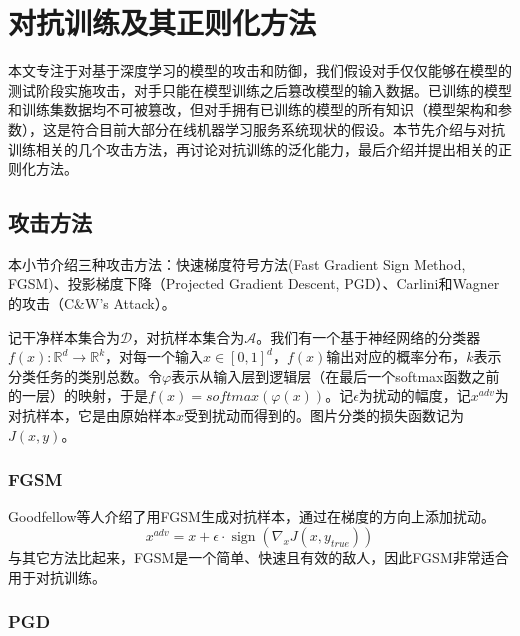 \chapter{对抗训练及其正则化方法}

本文专注于对基于深度学习的模型的攻击和防御，我们假设对手仅仅能够在模型的测试阶段实施攻击，对手只能在模型训练之后篡改模型的输入数据。已训练的模型和训练集数据均不可被篡改，但对手拥有已训练的模型的所有知识（模型架构和参数），这是符合目前大部分在线机器学习服务系统现状的假设。本节先介绍与对抗训练相关的几个攻击方法，再讨论对抗训练的泛化能力，最后介绍并提出相关的正则化方法。

\section{攻击方法}

本小节介绍三种攻击方法：快速梯度符号方法(Fast Gradient Sign Method, FGSM)\cite{goodfellow2014explaining}、投影梯度下降（Projected Gradient Descent, PGD）\cite{madry2018towards}、Carlini和Wagner的攻击（C\&W's Attack）\cite{carlini2017towards}。

记干净样本集合为$\mathcal{D}$，对抗样本集合为$\mathcal{A}$。我们有一个基于神经网络的分类器$f(x) : \mathbb{R}^d \to \mathbb{R}^k$，对每一个输入$x \in [0, 1]^d$，$f(x)$输出对应的概率分布，$k$表示分类任务的类别总数。令$\varphi$表示从输入层到逻辑层（在最后一个softmax函数之前的一层）的映射，于是$f(x) = softmax(\varphi(x))$。记$\epsilon$为扰动的幅度，记$x^{adv}$为对抗样本，它是由原始样本$x$受到扰动而得到的。图片分类的损失函数记为$J(x, y)$。

\subsection{FGSM}

Goodfellow等人介绍了用FGSM生成对抗样本，通过在梯度的方向上添加扰动。
\begin{equation}
    x^{a d v}=x+\epsilon \cdot \operatorname{sign}\left(\nabla_{x} J\left(x, y_{t r u e}\right)\right)
\end{equation}
与其它方法比起来，FGSM是一个简单、快速且有效的敌人，因此FGSM非常适合用于对抗训练。

\subsection{PGD}


